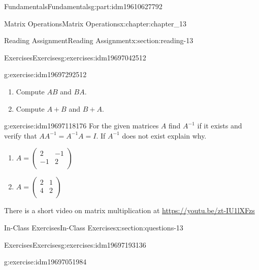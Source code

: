 \documentclass[oneside,10pt,]{book}
\numberwithin{equation}{section}
\begin{document}
\begin{partptx}{Fundamentals}{}{Fundamentals}{}{}{g:part:idm19610627792}
\begin{chapterptx}{Matrix Operations}{}{Matrix Operations}{}{}{x:chapter:chapter_13}
\begin{sectionptx}{Reading Assignment}{}{Reading Assignment}{}{}{x:section:reading-13}
\begin{exercises-subsection-numberless}{Exercises}{}{Exercises}{}{}{g:exercises:idm19697042512}
\begin{exercisegroup}
\begin{divisionexerciseeg}{1}{}{}{g:exercise:idm19697292512}
\begin{enumerate}[label=(\alph*)]
\item{}Compute \(A B\) and \(B A\).%
\item{}Compute \(A + B\) and \(B + A\).%
\end{enumerate}
%
\end{divisionexerciseeg}%
\begin{divisionexerciseeg}{2}{}{}{g:exercise:idm19697118176}%
For the given matrices \(A\) find \(A^{-1}\) if it exists and verify that \(A A^{-1}=A^{-1}A = I\). If \(A^{-1}\) does not exist explain why.%
\par
%
\begin{enumerate}[label=(\alph*)]
\item{}\(\displaystyle A =\left(
\begin{array}{cc}
2 & -1 \\
-1 & 2 \\
\end{array}
\right)\)%
\item{}\(\displaystyle A = \left(
\begin{array}{cc}
2 & 1 \\
4 & 2 \\
\end{array}
\right)\)%
\end{enumerate}
%
\end{divisionexerciseeg}%
\end{exercisegroup}
\par\medskip\noindent
\begin{conclusion}{}%
There is a short video on matrix multiplication at \url{https://youtu.be/zt-IU1lXFzs}%
\end{conclusion}%
\end{exercises-subsection-numberless}
\end{sectionptx}
%
%
\typeout{************************************************}
\typeout{************************************************}
%
\begin{sectionptx}{In-Class Exercises}{}{In-Class Exercises}{}{}{x:section:questions-13}
%
%
%
\typeout{************************************************}
\typeout{************************************************}
%
\begin{exercises-subsection-numberless}{Exercises}{}{Exercises}{}{}{g:exercises:idm19697193136}
\par\medskip\noindent%
%
\begin{exercisegroup}
\begin{divisionexerciseeg}{1}{}{}{g:exercise:idm19697051984}%

\end{divisionexerciseeg}
\end{exercisegroup}
\end{exercises-subsection-numberless}
\end{sectionptx}
\end{chapterptx}
\end{partptx}
\end{document}
